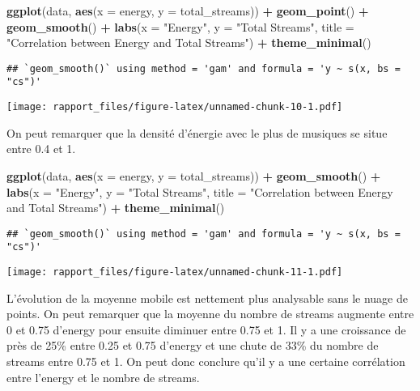 \documentclass[
]{article}
\newenvironment{Shaded}{\begin{snugshade}}{\end{snugshade}}
\newcommand{\AttributeTok}[1]{\textcolor[rgb]{0.13,0.29,0.53}{#1}}
\newcommand{\FunctionTok}[1]{\textcolor[rgb]{0.13,0.29,0.53}{\textbf{#1}}}
\newcommand{\NormalTok}[1]{#1}
\newcommand{\SpecialCharTok}[1]{\textcolor[rgb]{0.81,0.36,0.00}{\textbf{#1}}}
\newcommand{\StringTok}[1]{\textcolor[rgb]{0.31,0.60,0.02}{#1}}
\begin{document}
\begin{Shaded}
\begin{Highlighting}[]
\FunctionTok{ggplot}\NormalTok{(data, }\FunctionTok{aes}\NormalTok{(}\AttributeTok{x =}\NormalTok{ energy, }\AttributeTok{y =}\NormalTok{ total\_streams)) }\SpecialCharTok{+} \FunctionTok{geom\_point}\NormalTok{() }\SpecialCharTok{+}
  \FunctionTok{geom\_smooth}\NormalTok{() }\SpecialCharTok{+}
  \FunctionTok{labs}\NormalTok{(}\AttributeTok{x =} \StringTok{"Energy"}\NormalTok{, }\AttributeTok{y =} \StringTok{"Total Streams"}\NormalTok{, }\AttributeTok{title =} \StringTok{"Correlation between Energy and Total Streams"}\NormalTok{) }\SpecialCharTok{+}
  \FunctionTok{theme\_minimal}\NormalTok{()}
\end{Highlighting}
\end{Shaded}

\begin{verbatim}
## `geom_smooth()` using method = 'gam' and formula = 'y ~ s(x, bs = "cs")'
\end{verbatim}

\texttt{[image: rapport\_files/figure-latex/unnamed-chunk-10-1.pdf]}

On peut remarquer que la densité d'énergie avec le plus de musiques se
situe entre 0.4 et 1.

\begin{Shaded}
\begin{Highlighting}[]
\FunctionTok{ggplot}\NormalTok{(data, }\FunctionTok{aes}\NormalTok{(}\AttributeTok{x =}\NormalTok{ energy, }\AttributeTok{y =}\NormalTok{ total\_streams)) }\SpecialCharTok{+}
  \FunctionTok{geom\_smooth}\NormalTok{() }\SpecialCharTok{+}
  \FunctionTok{labs}\NormalTok{(}\AttributeTok{x =} \StringTok{"Energy"}\NormalTok{, }\AttributeTok{y =} \StringTok{"Total Streams"}\NormalTok{, }\AttributeTok{title =} \StringTok{"Correlation between Energy and Total Streams"}\NormalTok{) }\SpecialCharTok{+}
  \FunctionTok{theme\_minimal}\NormalTok{()}
\end{Highlighting}
\end{Shaded}

\begin{verbatim}
## `geom_smooth()` using method = 'gam' and formula = 'y ~ s(x, bs = "cs")'
\end{verbatim}

\texttt{[image: rapport\_files/figure-latex/unnamed-chunk-11-1.pdf]}

L'évolution de la moyenne mobile est nettement plus analysable sans le
nuage de points. On peut remarquer que la moyenne du nombre de streams
augmente entre 0 et 0.75 d'energy pour ensuite diminuer entre 0.75 et 1.
Il y a une croissance de près de 25\% entre 0.25 et 0.75 d'energy et une
chute de 33\% du nombre de streams entre 0.75 et 1. On peut donc
conclure qu'il y a une certaine corrélation entre l'energy et le nombre
de streams.
\end{document}
